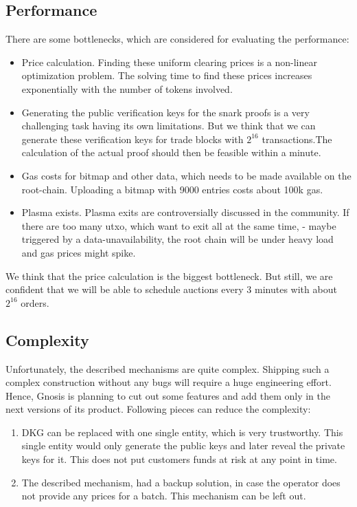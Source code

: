 \documentclass[11pt,parskip=full]{scrartcl}%
\begin{document}
\subsection{Performance}
There are some bottlenecks, which are considered for evaluating the performance:
\begin{itemize}
  \item Price calculation. Finding these uniform clearing prices is a non-linear optimization problem. The solving time to find these prices increases exponentially with the number of tokens involved. 
\item Generating the public verification keys for the snark proofs is a very challenging task having its own limitations. But we think that we can generate these verification keys for trade blocks with $2^{16}$ transactions.The calculation of the actual proof should then be feasible within a minute.
\item Gas costs for bitmap and other data, which needs to be made available on the root-chain. Uploading a bitmap with 9000 entries costs about 100k gas.
\item Plasma exists. Plasma exits are controversially discussed in the community. If there are too many utxo, which want to exit all at the same time, - maybe triggered by a data-unavailability, the root chain will be under heavy load and gas prices might spike.
\end{itemize}
We think that the price calculation is the biggest bottleneck. But still, we are confident that we will be able to schedule auctions every 3 minutes with about $2^{16}$ orders.
\subsection{Complexity}
Unfortunately, the described mechanisms are quite complex. Shipping such a complex construction without any bugs will require a huge engineering effort. Hence, Gnosis is planning to cut out some features and add them only in the next versions of its product.\newline
Following pieces can reduce the complexity:\begin{enumerate}
\item DKG can be replaced with one single entity, which is very trustworthy. This single entity would only generate the public keys and later reveal the private keys for it. This does not put customers funds at risk at any point in time.
\item The described mechanism, had a backup solution, in case the operator does not provide any prices for a batch. This mechanism can be left out.
\end{enumerate}
\end{document}
